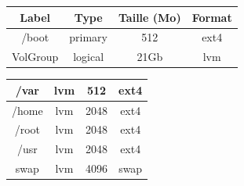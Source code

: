 \begin{center}
  \begin{tabularx}{\linewidth}{|C|C|C|C|}
    \hline
    Label & Type & Taille (Mo) & Format \\
    \hline
    \hline
    /boot & primary & 512 & ext4 \\
    \hline
    VolGroup & logical & 21Gb & lvm \\
    \hline
  \end{tabularx}
\end{center}

\begin{center}
  \begin{tabularx}{\linewidth}{|C|C|C|C|}
    \hline
    /var & lvm & 512 & ext4 \\
    \hline
    /home & lvm & 2048 & ext4 \\
    \hline
    /root & lvm & 2048 & ext4 \\
    \hline
    /usr & lvm & 2048 & ext4 \\
    \hline
    swap & lvm & 4096 & swap \\
    \hline
    \end{tabularx}
\end{center}

